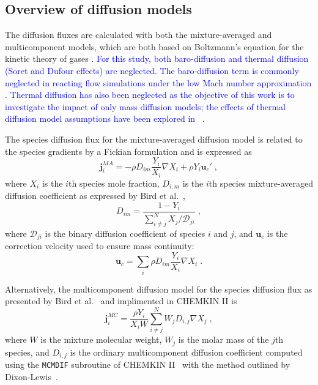 \documentclass[preprint,review,12pt]{elsarticle}
\begin{document}
\subsection{Overview of diffusion models}
The diffusion fluxes are calculated with both the mixture-averaged \cite{Bird1960} and multicomponent \cite{Hirschfelder1954} models, which are both based on Boltzmann's equation for the kinetic theory of gases \cite{Curtiss1949TransportMixtures, Hirschfelder1954, Chapman1970, Ferziger1972, Lam2006MulticomponentRevisited}.
\textcolor{blue}{For this study, both baro-diffusion and thermal diffusion (Soret and Dufour effects) are neglected.
The baro-diffusion term is commonly neglected in reacting flow simulations under the low Mach number approximation \textcolor{red}{\cite{Grcar2009TheFlames}}.
Thermal diffusion has also been neglected as the objective of this work is to investigate the impact of only mass diffusion models; the effects of thermal diffusion model assumptions have been explored in ~\cite{Schlup2017}.}

The species diffusion flux for the mixture-averaged diffusion model is related to the species gradients by a Fickian formulation and is expressed as
\begin{equation}\label{6}
\textbf{j}_{i}^{MA}=-\rho D_{im}\frac{Y_i}{X_{i}}\nabla X_{i}+\rho Y_{i}\textbf{u}_{c}' \;,
\end{equation}
where $X_i$ is the $i$th species mole fraction, $D_{i,m}$ is the $i$th species mixture-averaged diffusion coefficient as expressed by Bird et al.~\cite{Bird1960},
\begin{equation}\label{7}
D_{im}=\frac{1-Y_{i}}{\sum_{i\neq j}^{N} X_{j}/\mathcal{D}_{ji}} \;,
\end{equation}
where $\mathcal{D}_{ji}$ is the binary diffusion coefficient of species $i$ and $j$, and $\textbf{u}_{c}$ is the correction velocity used to ensure mass continuity:
\begin{equation} \label{8}
\textbf{u}_{c}=\sum_{i}\rho D_{im}\frac{Y_{i}}{X_{i}}\nabla X_{i} \;.
\end{equation}

Alternatively, the multicomponent diffusion model for the species diffusion flux as presented by Bird et al.~\cite{Bird1960} and implimented in CHEMKIN II \cite{Kee1989Chemkin-II:Kinetics} is
\begin{equation} \label{9}
\textbf{j}_{i}^{MC}=\frac{\rho Y_{i}}{X_{i}W}\sum_{i\neq j}^{N}W_{j}D_{i,j}\nabla{X_{j}} \;,
\end{equation}
where $W$ is the mixture molecular weight, $W_{j}$ is the molar mass of the $j$th species, and $D_{i,j}$ is the ordinary multicomponent diffusion coefficient computed using the \texttt{MCMDIF} subroutine of CHEMKIN II~\cite{Kee1989Chemkin-II:Kinetics} with the method outlined by Dixon-Lewis~\cite{Dixon-Lewis1968FlameSystems}.
\end{document}
